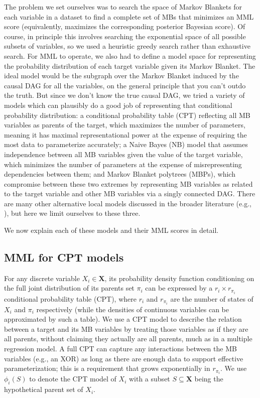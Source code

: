\documentclass{svmult}
\begin{document}
The problem we set ourselves was to search the space of Markov
Blankets for each variable in a dataset to find a complete set of MBs
that minimizes an MML score (equivalently, maximizes the corresponding
posterior Bayesian score). Of course, in principle this involves
searching the exponential space of all possible subsets of variables,
so we used a heuristic greedy search rather than exhaustive
search. For MML to operate, we also had to define a model space for
representing the probability distribution of each target variable
given its Markov Blanket. The ideal model would be the subgraph over
the Markov Blanket induced by the causal DAG for all the variables, on
the general principle that you can't outdo the truth. But since we
don't know the true causal DAG, we tried a variety of models which can
plausibly do a good job of representing that conditional probability
distribution: a conditional probability table (CPT) reflecting all MB
variables as parents of the target, which maximizes the number of
parameters, meaning it has maximal representational power at the
expense of requiring the most data to parameterize accurately; a Naive
Bayes (NB) model that assumes independence between all MB variables
given the value of the target variable, which minimizes the number of
parameters at the expense of misrepresenting dependencies between
them; and Markov Blanket polytrees (MBPs), which compromise between
these two extremes by representing MB variables as related to the
target variable and other MB variables via a singly connected
DAG. There are many other alternative local models discussed in the
broader literature (e.g., \citet{neil1999learning}), but here we limit
ourselves to these three.

We now explain each of these models and their MML scores in detail.

\subsection{MML for CPT models}
\label{sec:mml_cpt}

For any discrete variable $X_i \in \mathbf{X}$, its probability
density function conditioning on the full joint distribution of its
parents set $\pi_i$ can be expressed by a $r_i \times r_{\pi_i}$
conditional probability table (CPT), where $r_i$ and $r_{\pi_i}$ are
the number of states of $X_i$ and $\pi_i$ respectively (while the
densities of continuous variables can be approximated by such a
table). We use a CPT model to describe the relation between a target
and its MB variables by treating those variables as if they are all
parents, without claiming they actually are all parents, much as in a
multiple regression model.  A full CPT can capture any interactions
between the MB variables (e.g., an XOR) as long as there are enough
data to support effective parameterization; this is a requirement that
grows exponentially in $r_{\pi_i}$. We use $\phi_i(S)$ to denote the
CPT model of $X_i$ with a subset $S \subseteq \mathbf{X}$ being the
hypothetical parent set of $X_i$.
\end{document}
